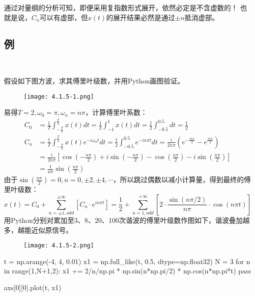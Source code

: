 通过对量纲的分析可知，即便采用复指数形式展开，依然必定是不含虚数的！
也就是说，$C_n$可以有虚部，但$x\left( t \right) $的展开结果必然是通过$\pm n$抵消虚部。

\subsection{例}

~

\begin{example}
假设如下图方波，求其傅里叶级数，并用Python画图验证。
\begin{figure}[ht]
\centering
\texttt{[image: 4.1.5-1.png]}
\end{figure}
\end{example}

易得$T=2,\omega _0=\pi ,\omega _n=n\pi $，计算傅里叶系数：
\begin{align*}
C_0&=\frac{1}{T}\int_{-\frac{T}{2}}^{\frac{T}{2}}{x\left( t \right) dt}=\frac{1}{2}\int_{-1}^1{x\left( t \right) dt}=\frac{1}{2}\int_{-0.5}^{0.5}{dt}=\frac{1}{2} \\
C_n&=\frac{1}{T}\int_{-\frac{T}{2}}^{\frac{T}{2}}{x\left( t \right) e^{-i\omega _nt}dt}=\frac{1}{2}\int_{-0.5}^{0.5}{e^{-in\pi t}dt} =\frac{i}{2n\pi}\left( e^{-\frac{in\pi}{2}}-e^{\frac{in\pi}{2}} \right) \\
&=\frac{i}{2n\pi}\left[ \cos \left( -\frac{n\pi}{2} \right) +i\sin \left( -\frac{n\pi}{2} \right) -\cos \left( \frac{n\pi}{2} \right) -i\sin \left( \frac{n\pi}{2} \right) \right] \\
&=\frac{1}{n\pi}\sin \left( \frac{n\pi}{2} \right)
\end{align*}
由于$\sin \left( \frac{n\pi}{2} \right) =0,n=0,\pm 2,\pm 4,\cdots $，所以跳过偶数以减小计算量，得到最终的傅里叶级数：
\[
x\left( t \right) =C_0+\sum_{n=\pm 1,odd}^{\pm \infty}{\left[ C_n\cdot e^{in\pi t} \right]}=\frac{1}{2}+\sum_{n=1,odd}^{+\infty}{\left[ 2\cdot \frac{\sin \left( n\pi /2 \right)}{n\pi}\cdot \cos \left( n\pi t \right) \right]}
\]
用Python分别对累加至3、8、20、100次谐波的傅里叶级数作图如下，谐波叠加越多，越能近似原信号。
\begin{figure}[h]
\centering
\texttt{[image: 4.1.5-2.png]}
\end{figure}

\begin{python}
t  = np.arange(-4, 4, 0.01)
x1 = np.full_like(t, 0.5, dtype=np.float32)
N = 3
for n in range(1,N+1,2):
    x1 += 2/n/np.pi * np.sin(n*np.pi/2) * np.cos(n*np.pi*t)
    pass

axs[0][0].plot(t, x1)
\end{python}

